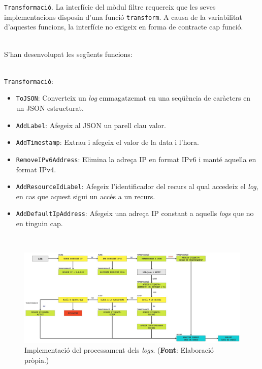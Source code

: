 \noindent
\texttt{Transformació}.
La interfície del mòdul filtre requereix que les seves implementacions disposin d'una funció \texttt{transform}.
A causa de la variabilitat d'aquestes funcions, la interfície no exigeix en forma de contracte cap funció.

\noindent \\
S'han desenvolupat les següents funcions:

\noindent \\
\texttt{Transformació}:
\begin{itemize}
    \item \texttt{ToJSON}: Converteix un \textit{\gls{log}} emmagatzemat en una seqüència de caràcters en un \gls{JSON} estructurat.
    \item \texttt{AddLabel}: Afegeix al JSON un parell clau valor.
    \item \texttt{AddTimestamp}: Extrau i afegeix el valor de la data i l'hora.
    \item \texttt{RemoveIPv6Address}: Elimina la adreça \gls{IP} en format IPv6 i manté aquella en format IPv4.
    \item \texttt{AddResourceIdLabel}: Afegeix l'identificador del recurs al qual accedeix el \textit{log}, en cas que aquest sigui un accés a un recurs.
    \item \texttt{AddDefaultIpAddress}: Afegeix una adreça \gls{IP} constant a aquells \textit{\gls{log}s} que no en tinguin cap.
\end{itemize}

\noindent \\
\begin{figure}[htbp]
    \centerline{\includegraphics[width=1.1\textwidth]{figures/log-processing-workflow}}
    \captionsetup{justification=centering}
    \caption[Implementació del processament dels \textit{logs}.]{Implementació del processament dels \textit{logs}. (\textbf{Font}: Elaboració pròpia.)}\label{fig:log-processing-workflow}
\end{figure}